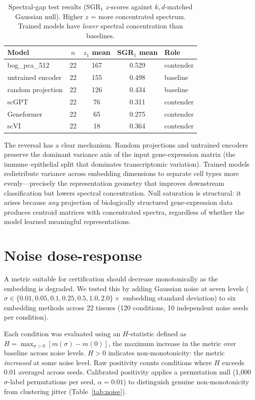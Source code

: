 \documentclass[11pt]{article}
\begin{document}
\medskip
\medskip
\begin{table}[h!]
\centering
\caption{Spectral-gap test results (SGR$_1$ $z$-scores against
$k,d$-matched Gaussian null). Higher $z$ = more concentrated spectrum.
Trained models have \emph{lower} spectral concentration than
baselines.}
\label{tab:sgr}
\small
\begin{tabular}{@{}lcccl@{}}
\toprule
Model & $n$ & $z_1$ mean & SGR$_1$ mean & Role \\
\midrule
bog\_pca\_512           & 22 & 167 & 0.529 & contender \\
untrained encoder       & 22 & 155 & 0.498 & baseline \\
random projection       & 22 & 126 & 0.434 & baseline \\
scGPT                   & 22 & 76  & 0.311 & contender \\
Geneformer              & 22 & 65  & 0.275 & contender \\
scVI                    & 22 & 18  & 0.364 & contender \\
\bottomrule
\end{tabular}
\end{table}

The reversal has a clear mechanism. Random projections and untrained
encoders preserve the dominant variance axis of the input gene-expression
matrix (the immune--epithelial split that dominates transcriptomic
variation). Trained models redistribute variance across embedding
dimensions to separate cell types more evenly---precisely the
representation geometry that improves downstream classification but
lowers spectral concentration. Null saturation is structural: it
arises because \emph{any} projection of biologically structured
gene-expression data produces centroid matrices with concentrated
spectra, regardless of whether the model learned meaningful
representations.


\section{Noise dose-response}
\label{app:noise}

A metric suitable for certification should decrease monotonically as the
embedding is degraded. We tested this by adding Gaussian noise at seven
levels ($\sigma \in \{0.01, 0.05, 0.1, 0.25, 0.5, 1.0, 2.0\} \times$
embedding standard deviation) to six embedding methods across 22
tissues (120 conditions, 10 independent noise seeds per condition).

Each condition was evaluated using an $H$-statistic defined as
$H = \max_{\sigma > 0}[m(\sigma) - m(0)]$, the maximum increase in
the metric over baseline across noise levels. $H > 0$ indicates
non-monotonicity: the metric \emph{increased} at some noise level.
Raw positivity counts conditions where $H$ exceeds 0.01 averaged across
seeds. Calibrated positivity applies a permutation null (1{,}000
$\sigma$-label permutations per seed, $\alpha = 0.01$) to
distinguish genuine non-monotonicity from clustering jitter
(Table~\ref{tab:noise}).
\end{document}
